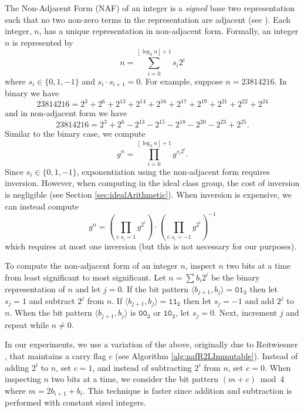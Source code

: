 \documentclass{ucalgthes1}
\theoremstyle{definition}
\newcommand{\floor}[1]{\left\lfloor #1 \right\rfloor}
\newcommand{\binary}[1]{\texttt{#1}_\texttt{2}}
\begin{document}
The Non-Adjacent Form (NAF) of an integer is a \emph{signed} base two representation such that no two non-zero terms in the representation are adjacent (see \cite[\S 9.1.4]{Cohen2006}).  Each integer, $n$, has a unique representation in non-adjacent form. Formally, an integer $n$ is represented by
\[
	n = \sum_{i=0}^{\floor{\log_2 n}+1} s_i 2^i
\]
where $s_i \in \{0, 1, -1\}$ and $s_i \cdot s_{i+1} = 0$.  For example, suppose $n = 23814216$.  In binary we have
\begin{equation}
\label{eq:binaryEg}
	23814216 = 2^3+2^6+2^{13}+2^{14}+2^{16}+2^{17}+2^{19}+2^{21}+2^{22}+2^{24}
\end{equation}
and in non-adjacent form we have
\begin{equation}
\label{eq:nafEg}
	23814216 = 2^3+2^6-2^{13}-2^{15}-2^{18}-2^{20}-2^{23}+2^{25}.
\end{equation}
Similar to the binary case, we compute
\begin{equation}
\label{eq:nafWithInv}
	g^n = \prod _{i=0}^{\floor{\log_2 n}+1} g^{s_i 2^i}.
\end{equation}
Since $s_i \in \{0, 1, -1\}$, exponentiation using the non-adjacent form requires inversion.  However, when computing in the ideal class group, the cost of inversion is negligible (see Section \ref{sec:idealArithmetic}).  When inversion is expensive, we can instead compute
\[
	g^n = \left( \prod_{i : s_i=1} g^{2^i} \right) \cdot \left( \prod_{i : s_i=-1} g^{2^i} \right)^{-1}
\]
which requires at most one inversion (but this is not necessary for our purposes).

To compute the non-adjacent form of an integer $n$, inspect $n$ two bits at a time from least significant to most significant.  Let $n=\sum b_i2^i$ be the binary representation of $n$ and let $j=0$.  If the bit pattern $\langle b_{j+1}, b_j \rangle = \binary{01}$ then let $s_j = 1$ and subtract $2^j$ from $n$.  If $\langle b_{j+1}, b_j \rangle = \binary{11}$ then let $s_j = -1$ and add $2^j$ to $n$.  When the bit pattern $\langle b_{j+1}, b_j \rangle$ is $\binary{00}$ or $\binary{10}$, let $s_j = 0$. Next, increment $j$ and repeat while $n \ne 0$.

In our experiments, we use a variation of the above, originally due to Reitwiesner \cite{reitwiesner1960}, that maintains a carry flag $c$ (see Algorithm \ref{alg:nafR2LImmutable}).  Instead of adding $2^i$ to $n$, set $c = 1$, and instead of subtracting $2^i$ from $n$, set $c = 0$.  When inspecting $n$ two bits at a time, we consider the bit pattern $(m+c) \bmod 4$ where $m = 2 b_{i+1} + b_i$.  This technique is faster since addition and subtraction is performed with constant sized integers.
\end{document}
